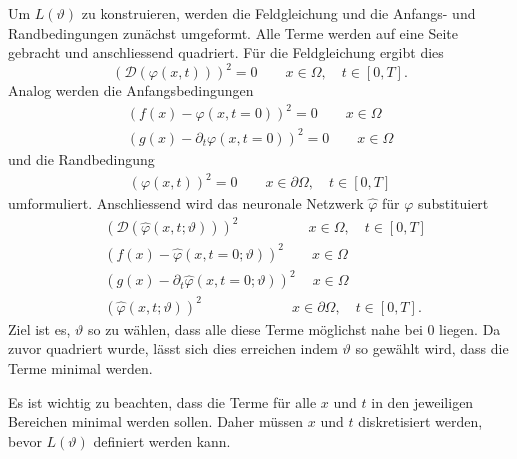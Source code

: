 Um \( L(\vartheta) \) zu konstruieren, werden die Feldgleichung und die Anfangs- und Randbedingungen zunächst umgeformt.
Alle Terme werden auf eine Seite gebracht und anschliessend quadriert.
Für die Feldgleichung ergibt dies
\begin{equation}
    \left(\mathcal{D}(\varphi(x, t))\right)^2 = 0 \qquad x \in \Omega, \quad t \in [0,T].
    \label{neuronal:feldgleichung_umformuliert}
\end{equation}
Analog werden die Anfangsbedingungen
\begin{equation}
    \begin{aligned}
        \left(f(x) - \varphi(x, t = 0)\right)^2 = 0 \qquad x \in \Omega\\
        \left(g(x) - \partial_t \varphi(x, t = 0)\right)^2 = 0 \qquad x \in \Omega
    \end{aligned}
    \label{neuronal:anfangsbedingung_umformuliert}
\end{equation}
und die Randbedingung
\begin{equation}
    \begin{aligned}
        \left(\varphi(x, t)\right)^2 = 0 \qquad x \in \partial \Omega, \quad t \in [0,T]
    \end{aligned}
    \label{neuronal:randbedingung_umformuliert}
\end{equation}
umformuliert.
Anschliessend wird das neuronale Netzwerk $\hat{\varphi}$ für $\varphi$ substituiert
\begin{equation}
    \begin{aligned}
        &\left(\mathcal{D}(\hat{\varphi}(x, t; \vartheta))\right)^2 \qquad \qquad \quad x \in \Omega, \quad t \in [0,T]\\
        &\left(f(x) - \hat{\varphi}(x, t = 0; \vartheta)\right)^2 \qquad x \in \Omega\\
        &\left(g(x) - \partial_t \hat{\varphi}(x, t = 0; \vartheta)\right)^2 \quad \: x \in \Omega\\
        &\left(\hat{\varphi}(x, t; \vartheta)\right)^2 \qquad \qquad \qquad \: \: x \in \partial \Omega, \quad t \in [0,T].
    \end{aligned}
    \label{neuronal:umformuliert_nn}
\end{equation}
Ziel ist es, $\vartheta$ so zu wählen, dass alle diese Terme möglichst nahe bei 0 liegen.
Da zuvor quadriert wurde, lässt sich dies erreichen indem $\vartheta$ so gewählt wird, dass die Terme minimal werden.

Es ist wichtig zu beachten, dass die Terme für alle $x$ und $t$ in den jeweiligen Bereichen minimal werden sollen.
Daher müssen $x$ und $t$ diskretisiert werden, bevor $L(\vartheta)$ definiert werden kann.

